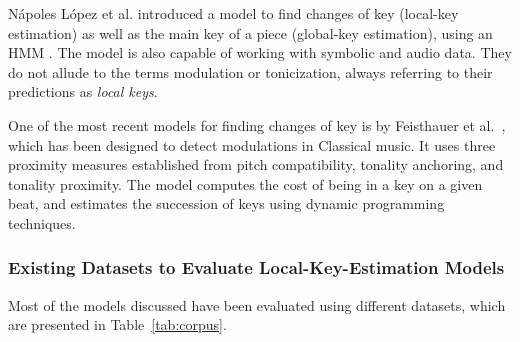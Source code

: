 N\'apoles L\'opez et al. introduced a model to find changes of key (local-key estimation) as well as the main key of a piece (global-key estimation), using an HMM \cite{napoleslopez2019key}. 
The model is also capable of working with symbolic and audio data. They do not allude to the terms modulation or tonicization, always referring to their predictions as \emph{local keys}.

One of the most recent models for finding changes of key is by Feisthauer et al.~\cite{feisthauer2020smc}, which has been designed to detect modulations in Classical music. 
It uses three proximity measures established from pitch compatibility, tonality anchoring, and tonality proximity. 
The model computes the cost of being in a key on a given beat, and estimates the succession of keys using dynamic programming techniques.



\subsubsection{Existing Datasets to Evaluate Local-Key-Estimation Models}

Most of the models discussed have been evaluated using different datasets, which are presented in Table~\ref{tab:corpus}.

